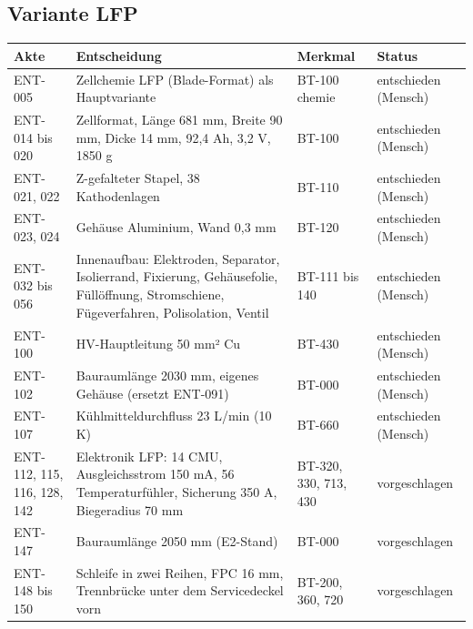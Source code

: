 \documentclass[10pt,a4paper]{article}
\begin{document}
\subsection*{Variante LFP}
\begin{longtable}{@{}p{1.9cm}p{7.2cm}p{3.5cm}p{2.0cm}@{}}\toprule
\textbf{Akte} & \textbf{Entscheidung} & \textbf{Merkmal} & \textbf{Status}\\\midrule\endhead
ENT-005 & Zellchemie LFP (Blade-Format) als Hauptvariante & BT-100 chemie & entschieden (Mensch)\\
ENT-014 bis 020 & Zellformat, Länge 681 mm, Breite 90 mm, Dicke 14 mm, 92,4 Ah, 3,2 V, 1850 g & BT-100 & entschieden (Mensch)\\
ENT-021, 022 & Z-gefalteter Stapel, 38 Kathodenlagen & BT-110 & entschieden (Mensch)\\
ENT-023, 024 & Gehäuse Aluminium, Wand 0,3 mm & BT-120 & entschieden (Mensch)\\
ENT-032 bis 056 & Innenaufbau: Elektroden, Separator, Isolierrand, Fixierung, Gehäusefolie, Füllöffnung, Stromschiene, Fügeverfahren, Polisolation, Ventil & BT-111 bis 140 & entschieden (Mensch)\\
ENT-100 & HV-Hauptleitung 50 mm² Cu & BT-430 & entschieden (Mensch)\\
ENT-102 & Bauraumlänge 2030 mm, eigenes Gehäuse (ersetzt ENT-091) & BT-000 & entschieden (Mensch)\\
ENT-107 & Kühlmitteldurchfluss 23 L/min (10 K) & BT-660 & entschieden (Mensch)\\
ENT-112, 115, 116, 128, 142 & Elektronik LFP: 14 CMU, Ausgleichsstrom 150 mA, 56 Temperaturfühler, Sicherung 350 A, Biegeradius 70 mm & BT-320, 330, 713, 430 & vorgeschlagen\\
ENT-147 & Bauraumlänge 2050 mm (E2-Stand) & BT-000 & vorgeschlagen\\
ENT-148 bis 150 & Schleife in zwei Reihen, FPC 16 mm, Trennbrücke unter dem Servicedeckel vorn & BT-200, 360, 720 & vorgeschlagen\\\bottomrule
\end{longtable}
\end{document}
